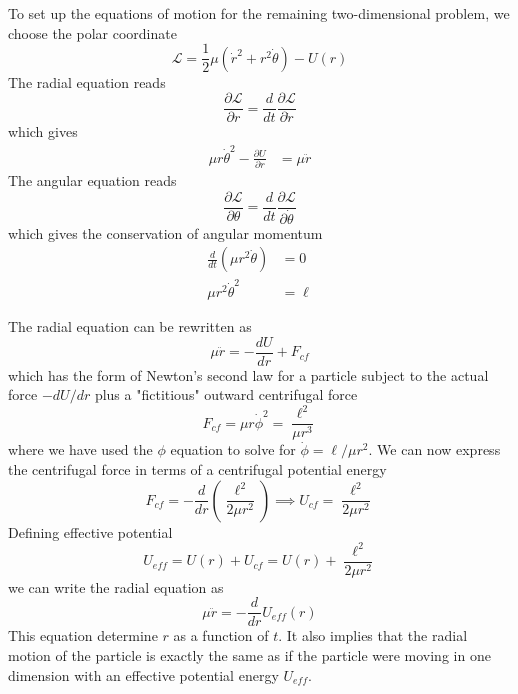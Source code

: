 \documentclass[../../../main.tex]{subfiles}
\begin{document}
To set up the equations of motion for the remaining two-dimensional problem, we  choose the polar coordinate
\begin{equation*}
    \mathcal{L}=\frac{1 }{2 }\mu \left( \dot{r}^2 +r^2\dot{\theta}\right) -U(r)
\end{equation*}
The radial equation reads
\begin{equation*}
    \frac{\partial \mathcal{L}}{\partial r} =\frac{d}{dt} \frac{\partial \mathcal{L}}{\partial \dot{r}}
\end{equation*}
which gives
\begin{align*}
    \mu r \dot{\theta}^2 - \frac{\partial U}{\partial r} & = \mu \ddot{r}
\end{align*}
The angular equation reads
\begin{equation*}
    \frac{\partial \mathcal{L}}{\partial \theta} =\frac{d}{dt} \frac{\partial \mathcal{L}}{\partial \dot{\theta}}
\end{equation*}
which gives the conservation of angular momentum
\begin{align*}
    \frac{d}{dt}(\mu r^2 \dot{\theta}) & =0    \\
    \mu r^2 \dot{\theta}^2             & =\ell
\end{align*}

The radial equation can be rewritten as
\begin{equation*}
    \mu \ddot{r}=-\frac{dU }{dr }+F_{cf}
\end{equation*}
which has the form of Newton's second law for a particle subject to the actual force $-dU /dr$ plus a "fictitious" outward centrifugal force
\begin{equation*}
    F_{cf}=\mu r \dot{\phi}^2=\frac{\ell^2 }{\mu r^3}
\end{equation*}
where we have used the $\phi$ equation to solve for $\dot{\phi}={\ell }/{\mu r^2}$.
We can now express the centrifugal force in terms of a centrifugal potential energy
\begin{equation*}
    F_{cf}=-\frac{d }{dr }\left( \frac{\ell^2 }{2\mu r^2} \right)
    \implies
    U_{cf}=\frac{\ell^2 }{2 \mu r^2}
\end{equation*}
Defining effective potential
\begin{equation*}
    U_{eff}=U(r)+U_{cf}=U(r)+\frac{\ell^2 }{2\mu r^2}
\end{equation*}
we can write the radial equation as
\begin{equation*}
    \mu \ddot{r}=-\frac{d }{dr }U_{eff}(r)
\end{equation*}
This equation determine $r$ as a function of $t$.
It also implies that the radial motion of the particle is exactly the same as if the particle were moving in one dimension with an effective potential energy $U_{eff}$.
\end{document}
